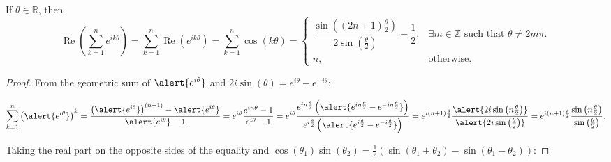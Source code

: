 \begin{frame}
	\frametitle{\secname}

	\begin{theorem}
		If $\theta\in\mathds{R}$, then
		\begin{equation*}
			\operatorname{Re}
			\left(\sum\limits_{k=1}^{n}e^{ik\theta}\right)=
			\sum\limits_{k=1}^{n}
			\operatorname{Re}
			\left(e^{ik\theta}\right)=
			\sum\limits_{k=1}^{n}
			\cos\left(k\theta\right)=
			\begin{cases}
				\dfrac{
					\sin\left(\left(2n+1\right)\frac{\theta}{2}\right)
				}{
					2\sin\left(\frac{\theta}{2}\right)
				}-\dfrac{1}{2},
				 & \exists m\in\mathds{Z}
				\text{ such that }\theta\neq 2m\pi. \\
				n,
				 & \text{otherwise}.
			\end{cases}
		\end{equation*}
	\end{theorem}

	\begin{proof}
		From the geometric sum of $\alert{e^{i\theta}}$ and
		\begin{math}
			2i\sin\left(\theta\right)=
			e^{i\theta}-e^{-i\theta}
		\end{math}:

		\begin{equation*}
			\sum\limits_{k=1}^{n}
			{\left(\alert{e^{i\theta}}\right)}^{k}=
			\frac{
				{\left(\alert{e^{i\theta}}\right)}^{\left(n+1\right)}-
				\alert{e^{i\theta}}
			}{
				\alert{e^{i\theta}}-1
			}=
			e^{i\theta}
			\frac{e^{in\theta}-1}{e^{i\theta}-1}=
			e^{i\theta}
			\frac{
				e^{in\frac{\theta}{2}}
				\left(
				\alert{e^{in\frac{\theta}{2}}-e^{-in\frac{\theta}{2}}}
				\right)
			}{
				e^{i\frac{\theta}{2}}
				\left(
				\alert{e^{i\frac{\theta}{2}}-e^{-i\frac{\theta}{2}}}
				\right)
			}=
			e^{i\left(n+1\right)\frac{\theta}{2}}
			\frac{
				\alert{2i\sin\left(n\frac{\theta}{2}\right)}
			}{
				\alert{2i\sin\left(\frac{\theta}{2}\right)}
			}=
			e^{i\left(n+1\right)\frac{\theta}{2}}
			\frac{
				\sin\left(n\frac{\theta}{2}\right)
			}{
				\sin\left(\frac{\theta}{2}\right)
			}.
		\end{equation*}

		Taking the \alert{real part} on the opposite sides of the
		equality and
		\begin{math}
			\cos\left(\theta_{1}\right)
			\sin\left(\theta_{2}\right)
			=
			\frac{1}{2}
			\left(
			\sin\left(\theta_{1}+\theta_{2}\right)-
			\sin\left(\theta_{1}-\theta_{2}\right)
			\right)
		\end{math}:


\end{proof}
\end{frame}
